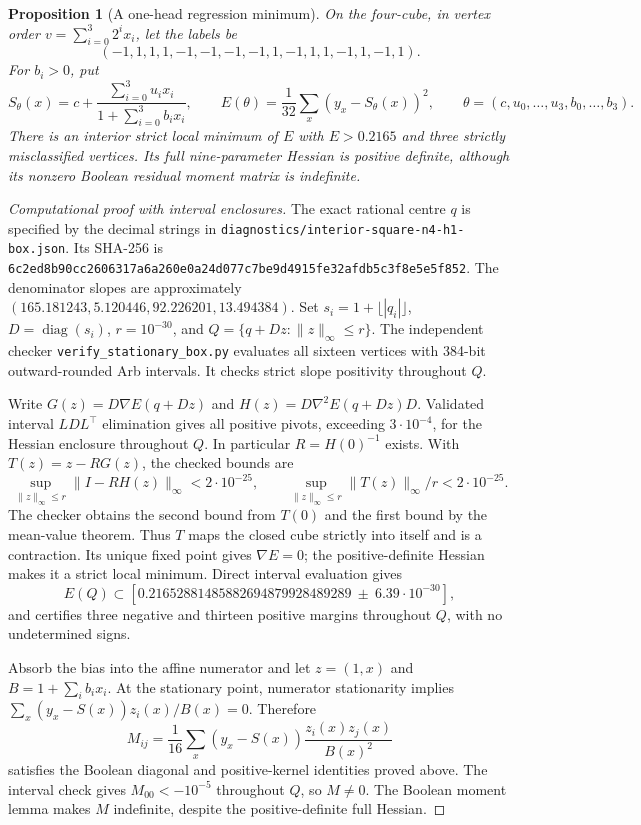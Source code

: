 \documentclass[11pt]{article}
\newtheorem{proposition}{Proposition}
\begin{document}
\begin{proposition}[A one-head regression minimum]
On the four-cube, in vertex order $v=\sum_{i=0}^3 2^i x_i$, let the labels be
\[
 (-1,1,1,1,-1,-1,-1,-1,1,-1,1,1,-1,1,-1,1).
\]
For $b_i>0$, put
\[
 S_\theta(x)=c+\frac{\sum_{i=0}^3 u_i x_i}{1+\sum_{i=0}^3 b_i x_i},
 \qquad E(\theta)=\frac1{32}\sum_x(y_x-S_\theta(x))^2,
 \qquad\theta=(c,u_0,\ldots,u_3,b_0,\ldots,b_3).
\]
There is an interior strict local minimum of $E$ with $E>0.2165$ and
three strictly misclassified vertices. Its full nine-parameter Hessian
is positive definite, although its nonzero Boolean residual moment
matrix is indefinite.
\end{proposition}
\begin{proof}[Computational proof with interval enclosures]
The exact rational centre $q$ is specified by the decimal strings in
\texttt{diagnostics/interior-square-n4-h1-box.json}. Its SHA-256 is
\texttt{6c2ed8b90cc2606317a6a260e0a24d077c7be9d4915fe32afdb5c3f8e5e5f852}.
The denominator slopes are approximately
$(165.181243,5.120446,92.226201,13.494384)$.
Set $s_i=1+\lfloor|q_i|\rfloor$, $D=\operatorname{diag}(s_i)$,
$r=10^{-30}$, and $Q=\{q+Dz:\|z\|_\infty\le r\}$.
The independent checker \texttt{verify\_stationary\_box.py} evaluates
all sixteen vertices with 384-bit outward-rounded Arb intervals.
It checks strict slope positivity throughout $Q$.

Write $G(z)=D\nabla E(q+Dz)$ and $H(z)=D\nabla^2E(q+Dz)D$.
Validated interval $LDL^{\top}$ elimination gives all positive pivots,
exceeding $3\cdot10^{-4}$, for the Hessian enclosure throughout $Q$.
In particular $R=H(0)^{-1}$ exists. With $T(z)=z-RG(z)$, the checked
bounds are
\[
 \sup_{\|z\|_\infty\le r}\|I-RH(z)\|_\infty<2\cdot10^{-25},
 \qquad \sup_{\|z\|_\infty\le r}\|T(z)\|_\infty/r<2\cdot10^{-25}.
\]
The checker obtains the second bound from $T(0)$ and the first bound
by the mean-value theorem. Thus $T$ maps the closed cube strictly into
itself and is a contraction. Its unique fixed point gives
$\nabla E=0$; the positive-definite Hessian makes it a strict local
minimum. Direct interval evaluation gives
\[
 E(Q)\subset
 [0.21652881485882694879928489289\ \pm\ 6.39\cdot10^{-30}],
\]
and certifies three negative and thirteen positive margins throughout $Q$,
with no undetermined signs.

Absorb the bias into the affine numerator and let $z=(1,x)$ and
$B=1+\sum_i b_i x_i$. At the stationary point, numerator stationarity
implies $\sum_x(y_x-S(x))z_i(x)/B(x)=0$. Therefore
\[
 M_{ij}=\frac1{16}\sum_x
       (y_x-S(x))\frac{z_i(x)z_j(x)}{B(x)^2}
\]
satisfies the Boolean diagonal and positive-kernel identities proved
above. The interval check gives
$M_{00}<-10^{-5}$ throughout $Q$, so $M\ne0$. The Boolean moment
lemma makes $M$ indefinite, despite the positive-definite full Hessian.
\end{proof}
\end{document}
